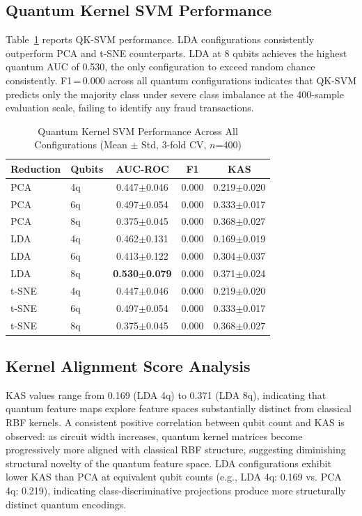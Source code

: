 \documentclass[journal]{IEEEtran}
\begin{document}
\subsection{Quantum Kernel SVM Performance}
Table~\ref{tab:quantum_results} reports QK-SVM performance. 
LDA configurations consistently outperform PCA and t-SNE 
counterparts. LDA at 8 qubits achieves the highest quantum 
AUC of 0.530, the only configuration to exceed random chance 
consistently. F1\,=\,0.000 across all quantum configurations 
indicates that QK-SVM predicts only the majority class under 
severe class imbalance at the 400-sample evaluation scale, 
failing to identify any fraud transactions.

\begin{table}[h]
\caption{Quantum Kernel SVM Performance Across All 
Configurations (Mean $\pm$ Std, 3-fold CV, $n$=400)}
\label{tab:quantum_results}
\centering
\begin{tabular}{llccc}
\toprule
\textbf{Reduction} & \textbf{Qubits} & \textbf{AUC-ROC} & 
\textbf{F1} & \textbf{KAS} \\
\midrule
PCA   & 4q & 0.447$\pm$0.046 & 0.000 & 0.219$\pm$0.020 \\
PCA   & 6q & 0.497$\pm$0.054 & 0.000 & 0.333$\pm$0.017 \\
PCA   & 8q & 0.375$\pm$0.045 & 0.000 & 0.368$\pm$0.027 \\
LDA   & 4q & 0.462$\pm$0.131 & 0.000 & 0.169$\pm$0.019 \\
LDA   & 6q & 0.413$\pm$0.122 & 0.000 & 0.304$\pm$0.037 \\
LDA   & 8q & \textbf{0.530$\pm$0.079} & 0.000 & 0.371$\pm$0.024 \\
t-SNE & 4q & 0.447$\pm$0.046 & 0.000 & 0.219$\pm$0.020 \\
t-SNE & 6q & 0.497$\pm$0.054 & 0.000 & 0.333$\pm$0.017 \\
t-SNE & 8q & 0.375$\pm$0.045 & 0.000 & 0.368$\pm$0.027 \\
\bottomrule
\end{tabular}
\end{table}

\subsection{Kernel Alignment Score Analysis}
KAS values range from 0.169 (LDA 4q) to 0.371 (LDA 8q), 
indicating that quantum feature maps explore feature spaces 
substantially distinct from classical RBF kernels. A 
consistent positive correlation between qubit count and KAS 
is observed: as circuit width increases, quantum kernel 
matrices become progressively more aligned with classical 
RBF structure, suggesting diminishing structural novelty 
of the quantum feature space. LDA configurations exhibit 
lower KAS than PCA at equivalent qubit counts (e.g., LDA 4q: 
0.169 vs. PCA 4q: 0.219), indicating class-discriminative 
projections produce more structurally distinct quantum 
encodings.
\end{document}
